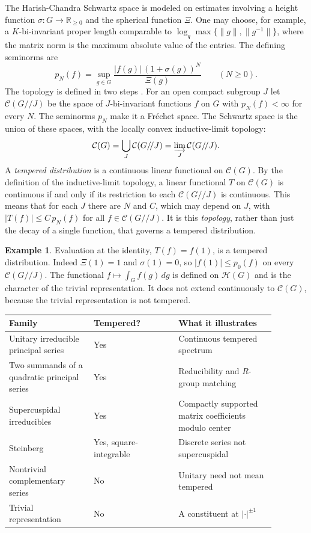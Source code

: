 \documentclass[12pt,letterpaper]{amsart}
\numberwithin{equation}{section}
\theoremstyle{definition}
\newtheorem*{example*}{Example}
\theoremstyle{remark}
\newcommand{\calH}{\mathcal H}
\newcommand{\calC}{\mathcal C}
\begin{document}
The Harish-Chandra Schwartz space is modeled on estimates involving a height function $\sigma:G\to\mathbb R_{\ge0}$ and the spherical function $\Xi$.  One may choose, for example, a $K$-bi-invariant proper length comparable to
$\log_q\max\{\|g\|,\|g^{-1}\|\}$, where the matrix norm is the maximum absolute value of the entries. The defining seminorms are
\begin{equation}\label{eq:seminorms}
p_N(f)=\sup_{g\in G}\frac{|f(g)|\,(1+\sigma(g))^N}{\Xi(g)}
\qquad(N\ge0).
\end{equation}
The topology is defined in two steps \cite{Si79,Wa03}. For an open compact subgroup $J$ let $\calC(G/\!/J)$ be the space of $J$-bi-invariant functions $f$ on $G$ with $p_N(f)<\infty$ for every $N$. The seminorms $p_N$ make it a Fr\'echet space. The Schwartz space is the union of these spaces, with the locally convex inductive-limit topology:
\begin{equation}\label{eq:schwartz-limit}
\calC(G)=\bigcup_J\calC(G/\!/J)=\varinjlim_J\calC(G/\!/J).
\end{equation}
A \emph{tempered distribution} is a continuous linear functional on $\calC(G)$. By the definition of the inductive-limit topology, a linear functional $T$ on $\calC(G)$ is continuous if and only if its restriction to each $\calC(G/\!/J)$ is continuous. This means that for each $J$ there are $N$ and $C$, which may depend on $J$, with $|T(f)|\le C\,p_N(f)$ for all $f\in\calC(G/\!/J)$. It is this \emph{topology}, rather than just the decay of a single function, that governs a tempered distribution.
\begin{example*}
Evaluation at the identity, $T(f)=f(1)$, is a tempered distribution. Indeed $\Xi(1)=1$ and $\sigma(1)=0$, so $|f(1)|\le p_0(f)$ on every $\calC(G/\!/J)$. The functional $f\mapsto\int_Gf(g)\,dg$ is defined on $\calH(G)$ and is the character of the trivial representation. It does not extend continuously to $\calC(G)$, because the trivial representation is not tempered.
\end{example*}

\begin{center}\small
\begin{tabular}{@{}p{0.28\linewidth}p{0.28\linewidth}p{0.32\linewidth}@{}}\toprule
Family & Tempered? & What it illustrates \\\midrule
Unitary irreducible principal series & Yes & Continuous tempered spectrum \\
Two summands of a quadratic principal series & Yes & Reducibility and $R$-group matching \\
Supercuspidal irreducibles & Yes & Compactly supported matrix coefficients modulo center \\
Steinberg & Yes, square-integrable & Discrete series not supercuspidal \\
Nontrivial complementary series & No & Unitary need not mean tempered \\
Trivial representation & No & A constituent at $|\cdot|^{\pm1}$ \\\bottomrule
\end{tabular}
\end{center}
\end{document}
